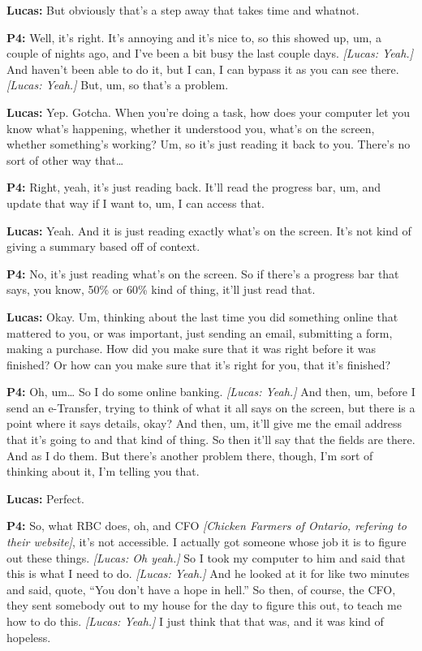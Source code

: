 \textbf{Lucas:} But obviously that's a step away that takes time and whatnot.

\textbf{P4:} Well, it's right. It's annoying and it's nice to, so this showed up, um, a couple of nights ago, and I've been a bit busy the last couple days. \textit{[Lucas: Yeah.]} And haven't been able to do it, but I can, I can bypass it as you can see there. \textit{[Lucas: Yeah.]} But, um, so that's a problem.

\textbf{Lucas:} Yep. Gotcha. When you're doing a task, how does your computer let you know what's happening, whether it understood you, what's on the screen, whether something's working? Um, so it's just reading it back to you. There's no sort of other way that\ldots{}

\textbf{P4:} Right, yeah, it's just reading back. It'll read the progress bar, um, and update that way if I want to, um, I can access that.

\textbf{Lucas:} Yeah. And it is just reading exactly what's on the screen. It's not kind of giving a summary based off of context.

\textbf{P4:} No, it's just reading what's on the screen. So if there's a progress bar that says, you know, 50\% or 60\% kind of thing, it'll just read that.

\textbf{Lucas:} Okay. Um, thinking about the last time you did something online that mattered to you, or was important, just sending an email, submitting a form, making a purchase. How did you make sure that it was right before it was finished? Or how can you make sure that it's right for you, that it's finished?

\textbf{P4:} Oh, um\ldots{} So I do some online banking. \textit{[Lucas: Yeah.]} And then, um, before I send an e-Transfer, trying to think of what it all says on the screen, but there is a point where it says details, okay? And then, um, it'll give me the email address that it's going to and that kind of thing. So then it'll say that the fields are there. And as I do them. But there's another problem there, though, I'm sort of thinking about it, I'm telling you that.

\textbf{Lucas:} Perfect.

\textbf{P4:} So, what RBC does, oh, and CFO \textit{[Chicken Farmers of Ontario, refering to their website]}, it's not accessible. I actually got someone whose job it is to figure out these things. \textit{[Lucas: Oh yeah.]} So I took my computer to him and said that this is what I need to do. \textit{[Lucas: Yeah.]} And he looked at it for like two minutes and said, quote, ``You don't have a hope in hell.'' So then, of course, the CFO, they sent somebody out to my house for the day to figure this out, to teach me how to do this. \textit{[Lucas: Yeah.]} I just think that that was, and it was kind of hopeless.

